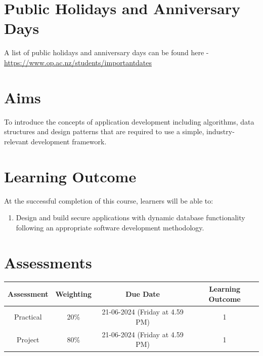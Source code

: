 \documentclass{article}
\begin{document}
\section*{Public Holidays and Anniversary Days}
A list of public holidays and anniversary days can be found here - \href{https://www.op.ac.nz/students/importantdates}{https://www.op.ac.nz/students/importantdates}

\section*{Aims}
To introduce the concepts of application development including algorithms, data structures and design patterns that are required to use a simple, industry-relevant development framework.

\section*{Learning Outcome}
At the successful completion of this course, learners will be able to:
\begin{enumerate}
	\item Design and build secure applications with dynamic database functionality following an appropriate software development methodology.
\end{enumerate}

\section*{Assessments}
\renewcommand{\arraystretch}{1.5}
\begin{tabular}{|c|c|c|c|}
	\hline
	\textbf{Assessment}                                 & \textbf{Weighting} & \textbf{Due Date}            & \textbf{Learning Outcome} \\ \hline
	\small Practical & \small 20\%        & \small 21-06-2024 (Friday at 4.59 PM)   & \small 1                   \\ \hline
	\small Project                 & \small 80\%        & \small 21-06-2024 (Friday at 4.59 PM) \small  & \small 1                   \\ \hline
\end{tabular}
\end{document}
